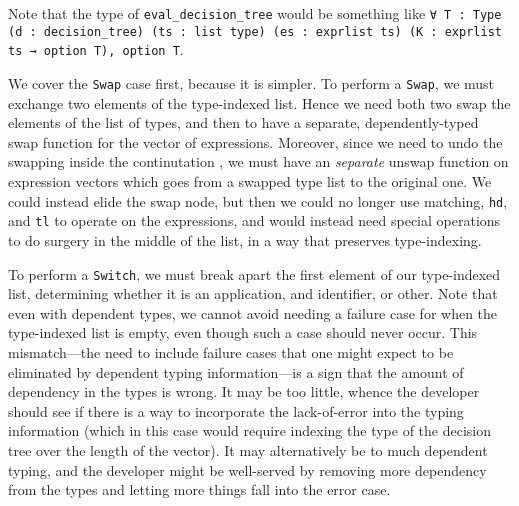 Note that the type of \texttt{eval_decision_tree} would be something like \texttt{∀ {T : Type} (d : decision_tree) (ts : list type) (es : exprlist ts) (K : exprlist ts → option T), option T}.


We cover the \texttt{Swap} case first, because it is simpler.
To perform a \texttt{Swap}, we must exchange two elements of the type-indexed list.
Hence we need both two swap the elements of the list of types, and then to have a separate, dependently-typed swap function for the vector of expressions.
Moreover, since we need to undo the swapping inside the continutation , we must have an \emph{separate} unswap function on expression vectors which goes from a swapped type list to the original one.
We could instead elide the swap node, but then we could no longer use matching, \texttt{hd}, and \texttt{tl} to operate on the expressions, and would instead need special operations to do surgery in the middle of the list, in a way that preserves type-indexing.

To perform a \texttt{Switch}, we must break apart the first element of our type-indexed list, determining whether it is an application, and identifier, or other.
Note that even with dependent types, we cannot avoid needing a failure case for when the type-indexed list is empty, even though such a case should never occur.
This mismatch---the need to include failure cases that one might expect to be eliminated by dependent typing information---is a sign that the amount of dependency in the types is wrong.
It may be too little, whence the developer should see if there is a way to incorporate the lack-of-error into the typing information (which in this case would require indexing the type of the decision tree over the length of the vector).
It may alternatively be to much dependent typing, and the developer might be well-served by removing more dependency from the types and letting more things fall into the error case.

